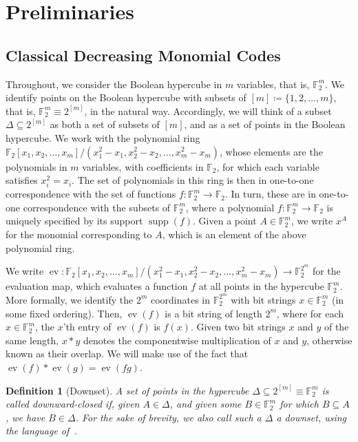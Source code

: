 \documentclass{article}
\newcounter{main}[section]
\newtheorem{definition}[main]{Definition}
\DeclareMathOperator{\supp}{supp}
\DeclareMathOperator{\ev}{ev}
\begin{document}
\section{Preliminaries}

\subsection{Classical Decreasing Monomial Codes}\label{subsec:params_and_duals}

Throughout, we consider the Boolean hypercube in $m$ variables, that is, $\mathbb{F}_2^m$. We identify points on the Boolean hypercube with subsets of $[m] \coloneq \{1, 2, \ldots, m\}$, that is, $\mathbb{F}_2^m \equiv 2^{[m]}$, in the natural way. Accordingly, we will think of a subset $\Delta \subseteq 2^{[m]}$ as both a set of subsets of $[m]$, and as a set of points in the Boolean hypercube. We work with the polynomial ring $\mathbb{F}_2[x_1, x_2, \ldots, x_m]/(x_1^2-x_1, x_2^2-x_2, \ldots, x_m^2-x_m)$, whose elements are the polynomials in $m$ variables, with coefficients in $\mathbb{F}_2$, for which each variable satisfies $x_i^2 = x_i$. The set of polynomials in this ring is then in one-to-one correspondence with the set of functions $f : \mathbb{F}_2^m \to \mathbb{F}_2$. In turn, these are in one-to-one correspondence with the subsets of $\mathbb{F}_2^m$, where a polynomial $f: \mathbb{F}_2^m \to \mathbb{F}_2$ is uniquely specified by its support $\supp(f)$. Given a point $A \in \mathbb{F}_2^m$, we write $x^A$ for the monomial corresponding to $A$, which is an element of the above polynomial ring.

We write $\ev: \mathbb{F}_2[x_1, x_2, \ldots, x_m]/(x_1^2-x_1, x_2^2-x_2, \ldots, x_m^2-x_m) \to \mathbb{F}_2^{2^m}$ for the evaluation map, which evaluates a function $f$ at all points in the hypercube $\mathbb{F}_2^m$. More formally, we identify the $2^m$ coordinates in $\mathbb{F}_2^{2^m}$ with bit strings $x \in \mathbb{F}_2^m$ (in some fixed ordering). Then, $\ev(f)$ is a bit string of length $2^m$, where for each $x \in \mathbb{F}_2^m$, the $x$'th entry of $\ev(f)$ is $f(x)$. Given two bit strings $x$ and $y$ of the same length, $x*y$ denotes the componentwise multiplication of $x$ and $y$, otherwise known as their overlap. We will make use of the fact that $\ev(f)*\ev(g) = \ev(fg)$.

\begin{definition}[Downset]
    A set of points in the hypercube $\Delta \subseteq 2^{[m]} \equiv \mathbb{F}_2^m$ is called downward-closed if, given $A \in \Delta$, and given some $B \in \mathbb{F}_2^m$ for which $B \subseteq A$, we have $B \in \Delta$. For the sake of brevity, we also call such a $\Delta$ a \textit{downset}, using the language of~\cite{srinivasan2019decoding}.
\end{definition}
\end{document}
